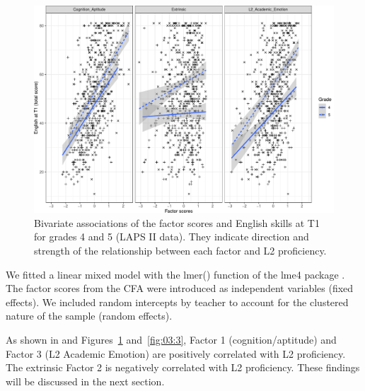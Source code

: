 \documentclass[output=paper]{langsci/langscibook}
\begin{document}
  
\begin{figure}
\includegraphics[width=\textwidth]{figures/Figure3.2.pdf}
\caption{\label{fig:03:2}Bivariate associations of the factor scores and English skills at T1 for grades 4 and 5 (LAPS II data). They indicate direction and strength of the relationship between each factor and L2 proficiency.}
\end{figure}

We fitted a linear mixed model with the lmer() function of the lme4 package \citep{BatesEtAl2015}. The factor scores from the CFA were introduced as independent variables (fixed effects). We included random intercepts by teacher to account for the clustered nature of the sample (random effects). 

As shown in  and Figures~\ref{fig:03:2} and~\ref{fig:03:3}, Factor 1 (cognition/aptitude) and Factor 3 (L2 Academic Emotion) are positively correlated with L2 proficiency. The extrinsic Factor 2 is negatively correlated with L2 proficiency. These findings will be discussed in the next section. 


\begin{table}
\small
\caption{\label{tab:03:3}Summary of the regression model of the factor scores on English proficiency at T1}
\end{table}
  
\end{document}
